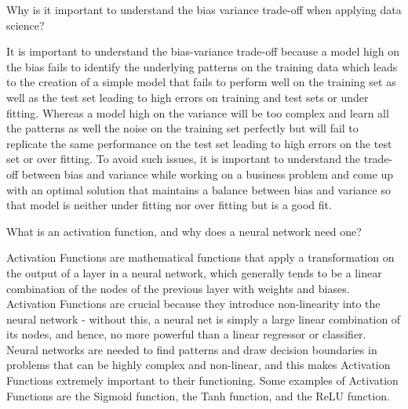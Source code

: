 	\begin{qanda}
		\begin{question}
Why is it important to understand the bias variance trade-off when applying data science?
		\end{question}
		\begin{answer}
It is important to understand the bias-variance trade-off because a model high on the bias fails to identify the underlying patterns on the training data which leads to the creation of a simple model that fails to perform well on the training set as well as the test set leading to high errors on training and test sets or under fitting. Whereas a model high on the variance will be too complex and learn all the patterns as well the noise on the training set perfectly but will fail to replicate the same performance on the test set leading to high errors on the test set or over fitting. To avoid such issues, it is important to understand the trade-off between bias and variance while working on a business problem and come up with an optimal solution that maintains a balance between bias and variance so that model is neither under fitting nor over fitting but is a good fit.
		\end{answer}
	\end{qanda}

	\begin{qanda}
		\begin{question}
What is an activation function, and why does a neural network need one?
		\end{question}
		\begin{answer}
Activation Functions are mathematical functions that apply a transformation on the output of a layer in a neural network, which generally tends to be a linear combination of the nodes of the previous layer with weights and biases. Activation Functions are crucial because they introduce non-linearity into the neural network - without this, a neural net is simply a large linear combination of its nodes, and hence, no more powerful than a linear regressor or classifier. Neural networks are needed to find patterns and draw decision boundaries in problems that can be highly complex and non-linear, and this makes Activation Functions extremely important to their functioning. Some examples of Activation Functions are the Sigmoid function, the Tanh function, and the ReLU function.
		\end{answer}
	\end{qanda}

